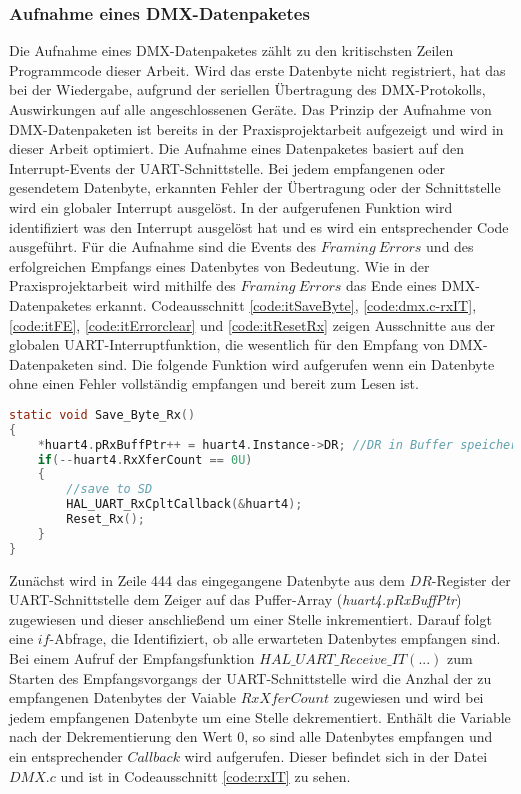 
\subsubsection{Aufnahme eines DMX-Datenpaketes}
Die Aufnahme eines DMX-Datenpaketes zählt zu den kritischsten Zeilen Programmcode dieser Arbeit. Wird das erste Datenbyte nicht registriert, hat das bei der Wiedergabe, aufgrund der seriellen Übertragung des DMX-Protokolls, Auswirkungen auf alle angeschlossenen Geräte. Das Prinzip der Aufnahme von DMX-Datenpaketen ist bereits in der Praxisprojektarbeit aufgezeigt und wird in dieser Arbeit optimiert.
Die Aufnahme eines Datenpaketes basiert auf den Interrupt-Events der UART-Schnittstelle. Bei jedem empfangenen oder gesendetem Datenbyte, erkannten Fehler der Übertragung oder der Schnittstelle wird ein globaler Interrupt ausgelöst. In der aufgerufenen Funktion wird identifiziert was den Interrupt ausgelöst hat und es wird ein entsprechender Code ausgeführt. Für die Aufnahme sind die Events des $Framing\ Errors$ und des erfolgreichen Empfangs eines Datenbytes von Bedeutung. Wie in der Praxisprojektarbeit wird mithilfe des $Framing\ Errors$ das Ende eines DMX-Datenpaketes erkannt. Codeausschnitt \ref{code:itSaveByte}, \ref{code:dmx.c-rxIT}, \ref{code:itFE}, \ref{code:itErrorclear} und \ref{code:itResetRx} zeigen Ausschnitte aus der globalen UART-Interruptfunktion, die wesentlich für den Empfang von DMX-Datenpaketen sind. Die folgende Funktion wird aufgerufen wenn ein Datenbyte ohne einen Fehler vollständig empfangen und bereit zum Lesen ist. 
\begin{lstlisting}[caption = stm32f4xx\_it.c: UART Save\_Byte\_Rx(),
label = code:itSaveByte, 
language = C, 
firstnumber = 442]
static void Save_Byte_Rx()
{
	*huart4.pRxBuffPtr++ = huart4.Instance->DR; //DR in Buffer speichern
	if(--huart4.RxXferCount == 0U)
	{
		//save to SD
		HAL_UART_RxCpltCallback(&huart4);
		Reset_Rx();
	}
}
\end{lstlisting}
Zunächst wird in Zeile 444 das eingegangene Datenbyte aus dem $DR$-Register der UART-Schnittstelle dem Zeiger auf das Puffer-Array (\textit{huart4.pRxBuffPtr}) zugewiesen und dieser anschließend um einer Stelle inkrementiert.
Darauf folgt eine $if$-Abfrage, die Identifiziert, ob alle erwarteten Datenbytes empfangen sind. Bei einem Aufruf der Empfangsfunktion $HAL\_UART\_Receive\_IT(...)$ zum Starten des Empfangsvorgangs der UART-Schnittstelle wird die Anzhal der zu empfangenen Datenbytes der Vaiable $RxXferCount$ zugewiesen und wird bei jedem empfangenen Datenbyte um eine Stelle dekrementiert. Enthält die Variable nach der Dekrementierung den Wert 0, so sind alle Datenbytes empfangen und ein entsprechender $Callback$ wird aufgerufen. Dieser befindet sich in der Datei $DMX.c$ und ist in Codeausschnitt \ref{code:rxIT} zu sehen. 
